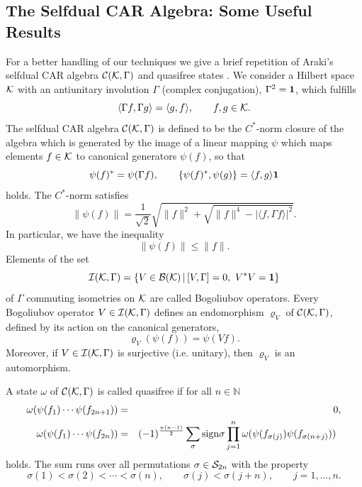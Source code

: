\documentclass[10pt,a4paper]{article}
\begin{document}
\subsection{The Selfdual CAR Algebra: Some
Useful Results}
For a better handling of our techniques we give a brief
repetition of Araki's selfdual CAR algebra
${\cal C}({\cal K},\Gamma)$ and quasifree
states \cite{Ara1,Ara2}.
We consider a Hilbert space ${\cal K}$ with an
antiunitary involution $\Gamma$ (complex conjugation),
$\Gamma^2={\bf 1}$, which fulfills
\[ \langle \Gamma f, \Gamma g \rangle = \langle g ,
f \rangle, \qquad f,g\in{\cal K}. \]
The selfdual CAR algebra ${\cal C}({\cal K},\Gamma)$
is defined to be the $C^*$-norm closure of the algebra
which is generated by the image
of a linear mapping $\psi$ which maps elements
$f\in{\cal K}$ to canonical generators $\psi(f)$,
so that
\[ \psi(f)^*=\psi(\Gamma f),\qquad
\{ \psi(f)^*,\psi(g) \} = \langle f,g \rangle {\bf 1} \]
holds. The $C^*$-norm satisfies \cite{Ara2}
\[ \|\psi(f)\| = \frac{1}{\sqrt{2}} \sqrt{\|f\|^2
+ \sqrt{\|f\|^4-|\langle f,\Gamma f \rangle |^2 }}. \]
In particular, we have the inequality
\begin{equation}
\label{Cstern}
\|\psi(f)\| \le \|f\|.
\end{equation}
Elements of the set
\[ {\cal I}({\cal K},\Gamma) = \{ V\in {\cal B}({\cal K})
\,|\, [V,\Gamma]=0,\,\, V^*V={\bf 1} \} \]
of $\Gamma$ commuting isometries on ${\cal K}$ are
called Bogoliubov operators. Every Bogoliubov
operator $V\in {\cal I}({\cal K},\Gamma)$ defines an
endomorphism $\varrho_V$ of ${\cal C}({\cal K},\Gamma)$,
defined by its action on the canonical generators,
\[ \varrho_V(\psi(f))=\psi(Vf). \]
Moreover, if $V\in {\cal I}({\cal K},\Gamma)$ is surjective
(i.e. unitary), then $\varrho_V$ is an automorphism.
\begin{definition}
A state $\omega$ of ${\cal C}({\cal K},\Gamma)$ is called
quasifree if for all $n\in \mathbb{N}$
\begin{eqnarray}
\omega (\psi(f_1) \cdots \psi(f_{2n+1})) &=& 0, \\
\label{perm1}
\omega (\psi(f_1) \cdots \psi(f_{2n})) &=&
(-1)^\frac{n(n-1)}{2} \sum_\sigma
\mbox{\rm sign} \sigma\prod_{j=1}^n \omega
(\psi(f_{\sigma(j)})\psi(f_{\sigma(n+j)}))\,\,\,
\end{eqnarray}
holds. The sum runs over all permutations
$\sigma \in {\cal S}_{2n}$ with the property
\begin{equation}
\label{perm2}
\sigma (1) < \sigma (2) < \cdots < \sigma (n),
\qquad \sigma (j) < \sigma (j+n), \qquad j=1,\ldots,n.
\end{equation}
\end{definition}
\end{document}
